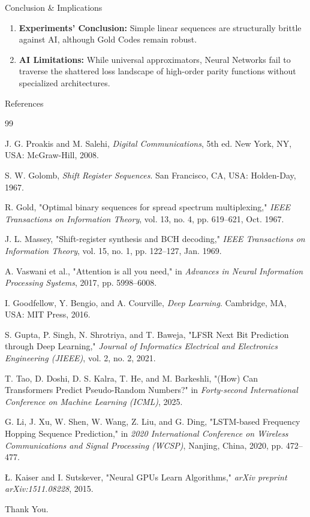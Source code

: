 \documentclass[aspectratio=169, 11pt]{beamer}
\begin{document}
\begin{frame}{Conclusion \& Implications}
    \begin{enumerate}
        \item \textbf{Experiments' Conclusion:} Simple linear sequences are structurally brittle against AI, although Gold Codes remain robust.
        \item \textbf{AI Limitations:} While universal approximators, Neural Networks fail to traverse the shattered loss landscape of high-order parity functions without specialized architectures.
    \end{enumerate}
\end{frame}
\begin{frame}[allowframebreaks]{References}
    \tiny
    \begin{thebibliography}{99}

    J. G. Proakis and M. Salehi, \textit{Digital Communications}, 5th ed. New York, NY, USA: McGraw-Hill, 2008.

    S. W. Golomb, \textit{Shift Register Sequences}. San Francisco, CA, USA: Holden-Day, 1967.

    R. Gold, "Optimal binary sequences for spread spectrum multiplexing," \textit{IEEE Transactions on Information Theory}, vol. 13, no. 4, pp. 619–621, Oct. 1967.

    J. L. Massey, "Shift-register synthesis and BCH decoding," \textit{IEEE Transactions on Information Theory}, vol. 15, no. 1, pp. 122–127, Jan. 1969.

    A. Vaswani et al., "Attention is all you need," in \textit{Advances in Neural Information Processing Systems}, 2017, pp. 5998–6008.

    I. Goodfellow, Y. Bengio, and A. Courville, \textit{Deep Learning}. Cambridge, MA, USA: MIT Press, 2016.

    S. Gupta, P. Singh, N. Shrotriya, and T. Baweja, "LFSR Next Bit Prediction through Deep Learning," \textit{Journal of Informatics Electrical and Electronics Engineering (JIEEE)}, vol. 2, no. 2, 2021.

    T. Tao, D. Doshi, D. S. Kalra, T. He, and M. Barkeshli, "(How) Can Transformers Predict Pseudo-Random Numbers?" in \textit{Forty-second International Conference on Machine Learning (ICML)}, 2025.

    G. Li, J. Xu, W. Shen, W. Wang, Z. Liu, and G. Ding, "LSTM-based Frequency Hopping Sequence Prediction," in \textit{2020 International Conference on Wireless Communications and Signal Processing (WCSP)}, Nanjing, China, 2020, pp. 472--477.

    \L. Kaiser and I. Sutskever, "Neural GPUs Learn Algorithms," \textit{arXiv preprint arXiv:1511.08228}, 2015.

    \end{thebibliography}
\end{frame}
\begin{frame}{}
    \centering
    {\Large Thank You.}
\end{frame}
\end{document}
